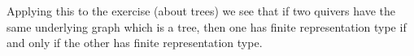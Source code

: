 Applying this to the exercise (about trees) we see that if two quivers
have the same underlying graph which is a tree, then one has finite
representation type if and only if the other has finite representation type.
